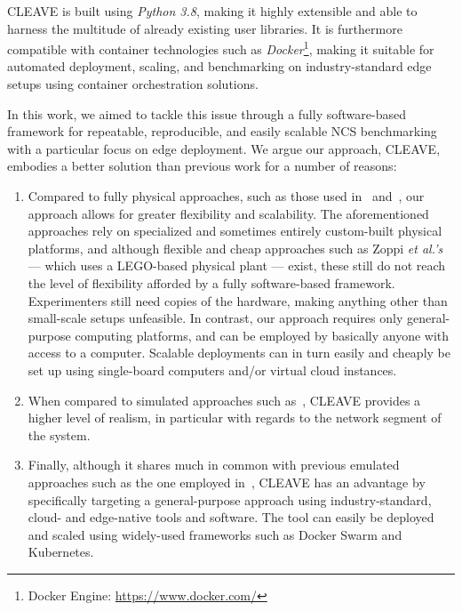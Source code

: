 \ac{CLEAVE} is built using \emph{Python 3.8}, making it highly extensible and able to harness the multitude of already existing user libraries.
It is furthermore compatible with container technologies such as \emph{Docker}\footnote{Docker Engine: \url{https://www.docker.com/}}, making it suitable for automated deployment, scaling, and benchmarking on industry-standard edge setups using container orchestration solutions.

In this work, we aimed to tackle this issue through a fully software-based framework for repeatable, reproducible, and easily scalable \ac{NCS} benchmarking with a particular focus on edge deployment.
We argue our approach, \ac{CLEAVE}, embodies a better solution than previous work for a number of reasons:
\begin{enumerate}
    \item Compared to fully physical approaches, such as those used in\ \cite{Baumann2018LowPower} and\ \cite{Cuenca2019UAV}, our approach allows for greater flexibility and scalability.
          The aforementioned approaches rely on specialized and sometimes entirely custom-built physical platforms, and although flexible and cheap approaches such as Zoppi \emph{et al.'s} --- which uses a LEGO-based physical plant --- exist, these still do not reach the level of flexibility afforded by a fully software-based framework.
          Experimenters still need copies of the hardware, making anything other than small-scale setups unfeasible.
          In contrast, our approach requires only general-purpose computing platforms, and can be employed by basically anyone with access to a computer.
          Scalable deployments can in turn easily and cheaply be set up using single-board computers and/or virtual cloud instances.
    \item When compared to simulated approaches such as\ \cite{Ma2019DynamicSched}, \ac{CLEAVE} provides a higher level of realism, in particular with regards to the network segment of the system.
    \item Finally, although it shares much in common with previous emulated approaches such as the one employed in\ \cite{Wang2020VoltageControl}, \ac{CLEAVE} has an advantage by specifically targeting a general-purpose approach using industry-standard, cloud- and edge-native tools and software.
          The tool can easily be deployed and scaled using widely-used frameworks such as Docker Swarm and Kubernetes.
\end{enumerate}

